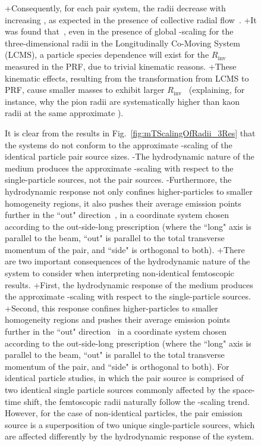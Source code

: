 \begin{table}[htbp]
\begin{figure}[h]
{+Consequently, for each pair system, the radii decrease with increasing \mt, as expected in the presence of collective radial flow~\cite{Akkelin:1995gh}.
+It was found that~\cite{Kisiel:2014upa}, even in the presence of global \mt-scaling for the three-dimensional radii in the Longitudinally Co-Moving System (LCMS), a particle species dependence will exist for the $R_{\mathrm{inv}}$ measured in the PRF, due to trivial kinematic reasons.
+These kinematic effects, resulting from the transformation from LCMS to PRF, cause smaller masses to exhibit larger $R_{\mathrm{inv}}$~\cite{Adam:2015vja} (explaining, for instance, why the pion radii are systematically higher than kaon radii at the same approximate \mt).
 
 It is clear from the results in Fig.~\ref{fig:mTScalingOfRadii_3Res} that the \LamK systems do not conform to the approximate \mt-scaling of the identical particle pair source sizes.
-The hydrodynamic nature of the medium produces the approximate \mt-scaling with respect to the single-particle sources, not the pair sources.
-Furthermore, the hydrodynamic response not only confines higher-\mt particles to smaller homogeneity regions, it also pushes their average emission points further in the ``out" direction~\cite{Retiere:2003kf}, in a coordinate system chosen according to the out-side-long prescription (where the ``long" axis is parallel to the beam, ``out" is parallel to the total transverse momentum of the pair, and ``side" is orthogonal to both).
+There are two important consequences of the hydrodynamic nature of the system to consider when interpreting non-identical femtoscopic results.
+First, the hydrodynamic response of the medium produces the approximate \mt-scaling with respect to the single-particle sources.
+Second, this response confines higher-\mt particles to smaller homogeneity regions and pushes their average emission points further in the ``out" direction~\cite{Retiere:2003kf} in a coordinate system chosen according to the out-side-long prescription (where the ``long" axis is parallel to the beam, ``out" is parallel to the total transverse momentum of the pair, and ``side" is orthogonal to both).
 For identical particle studies, in which the pair source is comprised of two identical single particle sources commonly affected by the space-time shift, the femtoscopic radii naturally follow the \mt-scaling trend.
 However, for the case of non-identical particles, the pair emission source is a superposition of two unique single-particle sources, which are affected differently by the hydrodynamic response of the system.
}
\end{figure}
\end{table}
